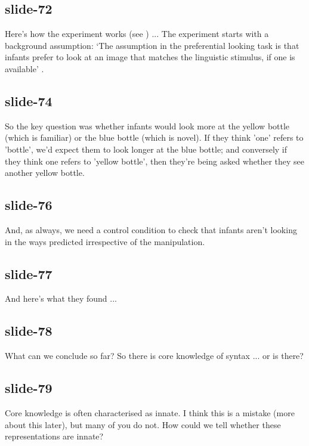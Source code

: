 \documentclass[12pt,\papersize]{extarticle}
\begin{document}
 
\subsection{slide-72}
Here's how the experiment works (see \citealp{lidz:2003_what}) ...
The experiment starts with a background assumption:
‘The assumption in the preferential looking task is that infants prefer to look at an image that matches the linguistic stimulus, if one is available’ \citep{lidz:2003_what}.
 
 
\subsection{slide-74}
So the key question was whether infants would look more at the yellow bottle (which is familiar) or the blue bottle (which is novel).
If they think 'one' refers to 'bottle', we'd expect them to look longer at the blue bottle;
and conversely if they think one refers to 'yellow bottle', then they're being asked whether they see another yellow bottle.
 
 
\subsection{slide-76}
And, as always, we need a control condition to check that infants aren't looking in the ways predicted irrespective of the manipulation.
 
 
\subsection{slide-77}
And here's what they found ...
 
 
\subsection{slide-78}
What can we conclude so far?
So there is core knowledge of syntax ... or is there?
 
 
\subsection{slide-79}
Core knowledge is often characterised as innate.
I think this is a mistake (more about this later), but many of you do not.
How could we tell whether these representations are innate?
 
 
\end{document}
